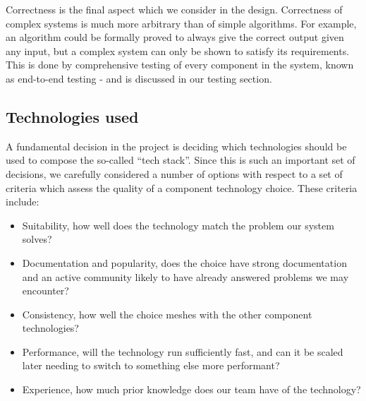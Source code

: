 \documentclass[10pt]{article}
\begin{document}
Correctness is the final aspect which we consider in the design. Correctness of
complex systems is much more arbitrary than of simple algorithms. For example,
an algorithm could be formally proved to always give the correct output given
any input, but a complex system can only be shown to satisfy its requirements.
This is done by comprehensive testing of every component in the system, known as
end-to-end testing - and is discussed in our testing section.


\subsection{Technologies used}

A fundamental decision in the project is deciding which technologies should be
used to compose the so-called ``tech stack''. Since this is such an important set
of decisions, we carefully considered a number of options with respect to a set
of criteria which assess the quality of a component technology choice. These
criteria include:
\begin{itemize}[leftmargin=1.2cm,noitemsep,align=left]
    \item
        Suitability, how well does the technology match the problem
        our system solves?
    \item
        Documentation and popularity, does the choice have strong
        documentation and an active community likely to have already answered problems
        we may encounter?
    \item
        Consistency, how well the choice meshes with the other
        component technologies?
    \item
        Performance, will the technology run sufficiently fast,
        and can it be scaled later needing to switch to something else more performant?
    \item
        Experience, how much prior knowledge does our team have of the technology?
\end{itemize}
\end{document}
